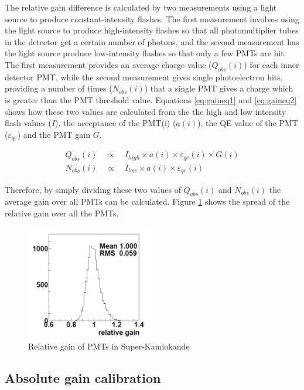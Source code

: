 The relative gain difference is calculated by two measurements using a light source to produce constant-intensity flashes. The first measurement involves using the light source to produce high-intensity flashes so that all photomultiplier tubes in the detector get a certain number of photons, and the second measurement has the light source produce low-intensity flashes so that only a few PMTs are hit. The first measurement provides an average charge value ($Q_{o b s}(i)$) for each inner detector PMT, while the second measurement gives single photoelectron hits, providing a number of times ($N_{o b s}(i)$) that a single PMT gives a charge which is greater than the PMT threshold value. Equations \ref{eq:gaineq1} and \ref{eq:gaineq2} shows how these two values are calculated from the the high and low intensity flash values ($I$), the acceptance of the PMT(i) ($a(i)$), the QE value of the PMT ($\varepsilon_{q e}$) and the PMT gain $G$. 

\begin{align}
Q_{o b s}(i) \quad \propto \quad I_{high} \times a(i) \times \varepsilon_{q e}(i) \times G(i) \label{eq:gaineq1} \\
N_{o b s}(i) \quad \propto \quad I_{low} \times a(i) \times \varepsilon_{q e}(i) \label{eq:gaineq2}
\end{align}


Therefore, by simply dividing these two values of $Q_{o b s}(i)$ and $N_{o b s}(i)$ the average gain over all PMTs can be calculated.  Figure \ref{fig:relativegain} shows the spread of the relative gain over all the PMTs. 

\begin{figure}
\centering
    \includegraphics[width=0.5\textwidth]{Figures/relativegain.png}
\caption{Relative gain of PMTs in Super-Kamiokande}
    \label{fig:relativegain}
\end{figure}

\subsection{Absolute gain calibration}

